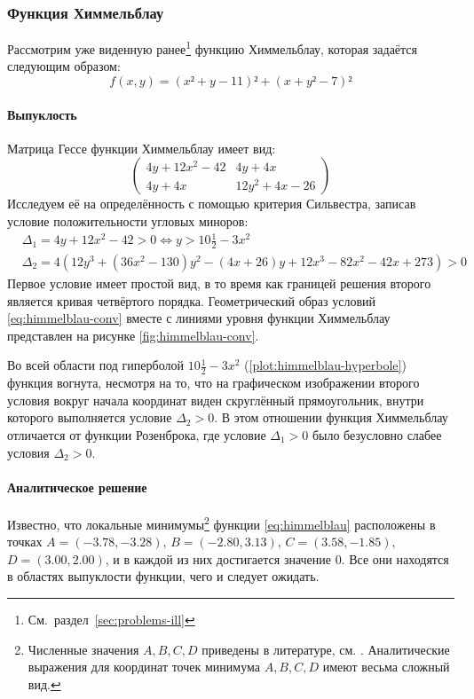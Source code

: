 \subsubsection{Функция Химмельблау}
\label{sec:himmelblau}

Рассмотрим уже виденную
ранее\footnote{См. раздел \ref{sec:problems-ill}} функцию Химмельблау,
которая задаётся следующим образом:
\begin{equation}
  \label{eq:himmelblau}
  \tag{$\chi$-\theequation}
  f(x, y) = (x² + y - 11)² + (x + y² - 7)²
\end{equation}

\paragraph{Выпуклость}

Матрица Гессе функции Химмельблау имеет вид:
\begin{equation}
  \label{eq:himmelblau-hess}
  \begin{pmatrix}
    4y+12x^2-42 & 4y+4x\\
    4y+4x & 12y^2+4x-26
  \end{pmatrix}
\end{equation}
Исследуем её на определённость с помощью критерия Сильвестра, записав
условие положительности угловых миноров:
\begin{align}
  \label{eq:himmelblau-conv}
  &\Delta_1 = 4y+12x^2-42 > 0 \iff y > 10\frac{1}{2}-3x^2 \\
  &\Delta_2 =
  4\left(12y^3+(36x^2-130)y^2-(4x+26)y+12x^3-82x^2-42x+273\right) > 0
\end{align}
Первое условие имеет простой вид, в то время как границей решения
второго является кривая четвёртого порядка. Геометрический образ
условий \eqref{eq:himmelblau-conv} вместе с линиями уровня функции
Химмельблау представлен на рисунке \ref{fig:himmelblau-conv}. 

Во всей области под гиперболой $10\frac{1}{2}-3x^2$
(\ref{plot:himmelblau-hyperbole}) функция вогнута, несмотря на то, что
на графическом изображении второго условия вокруг начала координат
виден скруглённый прямоугольник, внутри которого выполняется условие
$\Delta_2>0$. В этом отношении функция Химмельблау отличается от
функции Розенброка, где условие $\Delta_1>0$ было безусловно слабее
условия $\Delta_2>0$.

\paragraph{Аналитическое решение}
Известно, что локальные минимумы\footnote{Численные значения $A, B, C,
  D$ приведены в литературе, см. \cite{himmelblau75}. Аналитические
  выражения для координат точек минимума $A,B,C,D$ имеют весьма
  сложный вид.} функции \eqref{eq:himmelblau} расположены в точках
$A=(-3.78, -3.28)$, $B=(-2.80, 3.13)$, $C=(3.58, -1.85)$,
\mbox{$D=(3.00, 2.00)$}, и в каждой из них достигается значение $0$.
Все они находятся в областях выпуклости функции, чего и следует
ожидать.

